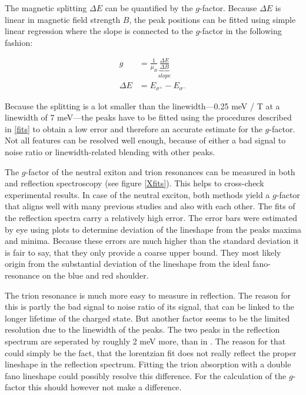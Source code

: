 The magnetic splitting $\Delta E$ can be quantified by the $g$-factor. Because $\Delta E$ is linear in magnetic field strength $B$, the peak positions can be fitted using simple linear regression where the slope is connected to the $g$-factor in the following fashion:

\begin{align}
	g &=  \frac{1}{\mu_B}\underbrace{\frac{\Delta E}{\Delta B}}_{slope} \\
	\Delta E &= E_{\sigma^+} - E_{\sigma^-}
\end{align}

Because the splitting is a lot smaller than the linewidth---0.25 meV / T at a linewidth of 7 meV---the peaks have to be fitted using the procedures described in \ref{fits} to obtain a low error and therefore an accurate estimate for the $g$-factor. Not all features can be resolved well enough, because of either a bad signal to noise ratio or linewidth-related blending with other peaks.

The $g$-factor of the neutral exiton and trion resonances can be measured in both \pl and reflection spectroscopy (see figure \ref{Xfits}). This helps to cross-check experimental results. In case of the neutral exciton, both methods yield a $g$-factor that aligns well with many previous studies \cite{plechinger_excitonic_2016, stier_exciton_2016, srivastava_valley_2015, mitioglu_magnetoexcitons_2016}and also with each other. The fits of the reflection spectra carry a relatively high error. The error bars were estimated by eye using plots to determine deviation of the lineshape from the peaks maxima and minima. Because these errors are much higher than the standard deviation it is fair to say, that they only provide a coarse upper bound. They most likely origin from the substantial deviation of the lineshape from the ideal fano-resonance on the blue and red shoulder.

The trion resonance is much more easy to measure in reflection. The reason for this is partly the bad signal to noise ratio of its \pl signal, that can be linked to the longer lifetime of the charged state\cite{hao_trion_2017}. But another factor seems to be the limited resolution due to the linewidth of the peaks. The two peaks in the reflection spectrum are seperated by roughly 2 meV more, than in \pl. The reason for that could simply be the fact, that the lorentzian fit does not really reflect the proper lineshape in the reflection spectrum. Fitting the trion absorption with a double fano lineshape could possibly resolve this difference. For the calculation of the $g$-factor this should however not make a difference.

